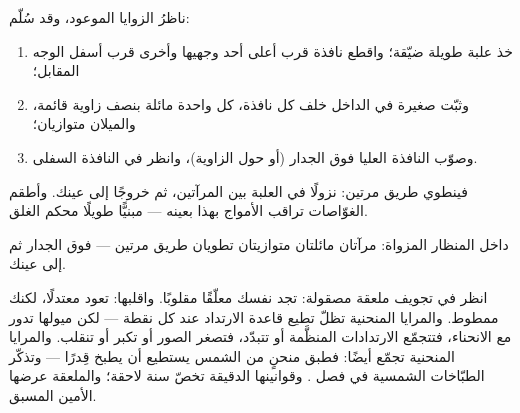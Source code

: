 \begin{method}\label{met:g5:mirrors-reflection:periscope}
ناظرُ الزوايا الموعود، وقد سُلّم:
\begin{enumerate}
  \item خذ علبة طويلة ضيّقة؛ واقطع نافذة قرب أعلى أحد وجهيها
        وأخرى قرب أسفل الوجه المقابل؛
  \item وثبّت  صغيرة في الداخل خلف كل نافذة، كل واحدة مائلة
        بنصف زاوية قائمة، والميلان متوازيان؛
  \item وصوّب النافذة العليا فوق الجدار (أو حول الزاوية)، وانظر
        في النافذة السفلى.
\end{enumerate}
فينطوي طريق  مرتين: نزولًا في العلبة بين المرآتين، ثم
خروجًا إلى عينك. وأطقم الغوّاصات تراقب الأمواج بهذا بعينه ---
مبنيًّا طويلًا محكم الغلق.
\end{method}

\begin{omfigure}

{\small داخل المنظار المزواة: مرآتان مائلتان متوازيتان تطويان
طريق  مرتين --- فوق الجدار ثم إلى عينك.}
\end{omfigure}

\begin{remark}\label{rem:g5:mirrors-reflection:curved}
انظر في تجويف ملعقة مصقولة: تجد نفسك معلّقًا مقلوبًا. واقلبها:
تعود معتدلًا، لكنك ممطوط. والمرايا المنحنية تظلّ تطيع قاعدة
الارتداد عند كل نقطة --- لكن ميولها تدور مع الانحناء، فتتجمّع
الارتدادات المنظَّمة أو تتبدّد، فتصغر الصور أو تكبر أو تنقلب.
والمرايا المنحنية تجمّع  أيضًا: فطبق منحنٍ من  الشمس
يستطيع أن يطبخ قِدرًا --- وتذكّر الطبّاخات الشمسية في فصل
. وقوانينها الدقيقة تخصّ سنة لاحقة؛ والملعقة عرضها الأمين
المسبق.
\end{remark}


